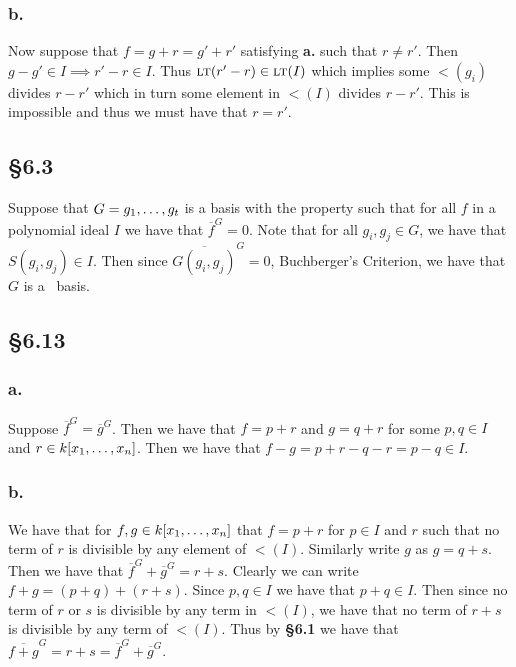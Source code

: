 \documentclass[letterpaper]{article}
\begin{document}
\subsubsection{b.}

Now suppose that $f = g + r = g' + r'$ satisfying \textbf{a.} such that $r \neq r'$. Then $g - g' \in I \implies r' - r \in I$. Thus $\lt(r' - r) \in \gen{\lt(I)}$ which implies some $\lt(g_{i})$ divides $r - r'$ which in turn some element in $\lt(I)$ divides $r - r'$. This is impossible and thus we must have that $r = r'$.

\subsection{\S 6.3}

Suppose that $G = \gen{g_{1}, \ldots, g_{t}}$ is a basis with the property such that for all $f$ in a polynomial ideal $I$ we have that $\overline{f}^{G} = 0$. Note that for all $g_{i}, g_{j} \in G$, we have that $S(g_{i}, g_{j}) \in I$. Then since $\overline{G(g_{i}, g_{j})}^{G} = 0$, Buchberger's Criterion, we have that $G$ is a \Grobner\ basis.

\subsection{\S 6.13}

\subsubsection{a.}

Suppose $\overline{f}^{G} = \overline{g}^{G}$. Then we have that $f = p + r$ and $g = q + r$ for some $p, q \in I$ and $r \in k\bqty{x_{1}, \ldots, x_{n}}$. Then we have that $f - g = p + r - q - r = p - q \in I$.

\subsubsection{b.}

We have that for $f, g \in k\bqty{x_{1}, \ldots, x_{n}}$ that $f = p + r$ for $p \in I$ and $r$ such that no term of $r$ is divisible by any element of $\lt(I)$. Similarly write $g$ as $g = q + s$. Then we have that $\overline{f}^{G} + \overline{g}^{G} = r + s$. Clearly we can write $f + g = (p + q) + (r + s)$. Since $p, q \in I$ we have that $p + q \in I$. Then since no term of $r$ or $s$ is divisible by any term in $\lt(I)$, we have that no term of $r + s$ is divisible by any term of $\lt(I)$. Thus by \textbf{\S 6.1} we have that $\overline{f + g}^{G} = r + s = \overline{f}^{G} + \overline{g}^{G}$.
\end{document}
